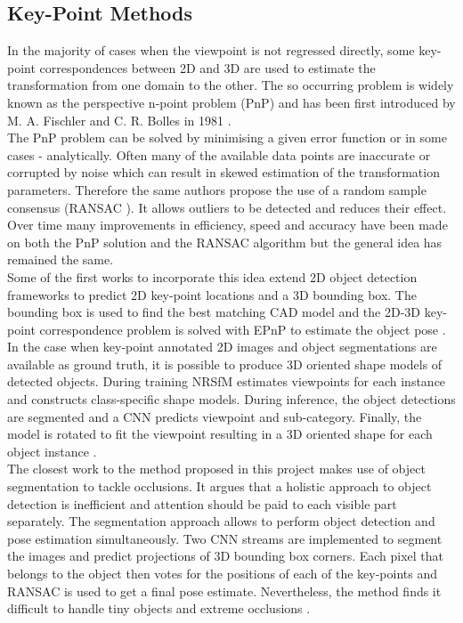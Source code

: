 \documentclass[main.tex]{subfiles}
\begin{document}
\subsection{Key-Point Methods}
\indent In the majority of cases when the viewpoint is not regressed directly, some key-point correspondences between 2D and 3D are used to estimate the transformation from one domain to the other. The so occurring problem is widely known as the perspective n-point problem (PnP) and has been first introduced by M. A. Fischler and C. R. Bolles in 1981 \cite{Fischler1981}. \\
\indent The PnP problem can be solved by minimising a given error function or in some cases - analytically. Often many of the available data points are inaccurate or corrupted by noise which can result in skewed estimation of the transformation parameters. Therefore the same authors propose the use of a random sample consensus (RANSAC \cite{Fischler1981}). It allows outliers to be detected and reduces their effect. Over time many improvements in efficiency, speed and accuracy have been made on both the PnP solution and the RANSAC algorithm but the general idea has remained the same.\\
\indent Some of the first works to incorporate this idea extend 2D object detection frameworks to predict 2D key-point locations and a 3D bounding box. The bounding box is used to find the best matching CAD model and the 2D-3D key-point correspondence problem is solved with EPnP \cite{Moreno-noguer2007} to estimate the object pose \cite{Chabot2017}.\\
\indent In the case when key-point annotated 2D images and object segmentations are available as ground truth, it is possible to produce 3D oriented shape models of detected objects. During training NRSfM \cite{Bregler2000} estimates viewpoints for each instance and constructs class-specific shape models. During inference, the object detections are segmented and a CNN predicts viewpoint and sub-category. Finally, the model is rotated to fit the viewpoint resulting in a 3D oriented shape for each object instance \cite{Kar2015}.\\
\indent The closest work to the method proposed in this project makes use of object segmentation to tackle occlusions. It argues that a holistic approach to object detection is inefficient and attention should be paid to each visible part separately. The segmentation approach allows to perform object detection and pose estimation simultaneously. Two CNN streams are implemented to segment the images and predict projections of 3D bounding box corners. Each pixel that belongs to the object then votes for the positions of each of the key-points and RANSAC is used to get a final pose estimate. Nevertheless, the method finds it difficult to handle tiny objects and extreme occlusions \cite{Hu2018}.
\end{document}

